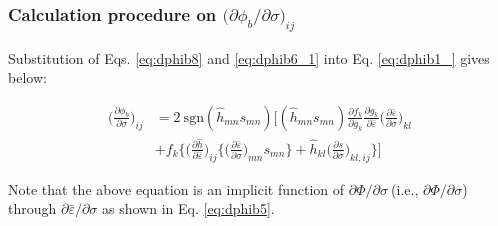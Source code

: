 \documentclass[12pt]{amsart}
\begin{document}
\subsubsection{Calculation procedure on $\big(\partial\phi_b/\partial \sigma\big)_{ij}$}
\label{sec:calc}


Substitution of Eqs. \ref{eq:dphib8} and \ref{eq:dphib6_1} into Eq. \ref{eq:dphib1_} gives below:

\begin{equation}
  \label{eq:dphib_main}
  \begin{split}
    \bigg(\frac{\partial\phi_b}{\partial \sigma}\bigg)_{ij} &= 2\ \text{sgn}(\hat{h}_{mn}s_{mn}) \bigg[(\hat{h}_{mn}s_{mn})
    \frac{\partial f_k}{\partial g_k} \frac{\partial g_k}{\partial \bar{\varepsilon}}
    \bigg(\frac{\partial\bar{\varepsilon}}{\partial\sigma}\bigg)_{kl}
   \\
    &+ f_k\bigg\{
    \bigg(\frac{\partial\hat{h}}{\partial\bar{\varepsilon}}\bigg)_{ij} \bigg\{\bigg(\frac{\partial\bar{\varepsilon}}{\partial\sigma}\bigg)_{mn} s_{mn}\bigg\} + \hat{h}_{kl} \bigg(\frac{\partial s}{\partial \sigma}\bigg)_{kl,ij}
      \bigg\}
    \bigg]
  \end{split}
\end{equation}

Note that the above equation is an implicit function of $\partial\Phi/\partial\sigma\ $(i.e., $\partial\Phi/\partial \sigma$) through $\partial\bar{\varepsilon}/\partial\sigma$ as shown in Eq. \ref{eq:dphib5}.



\newpage
\end{document}
